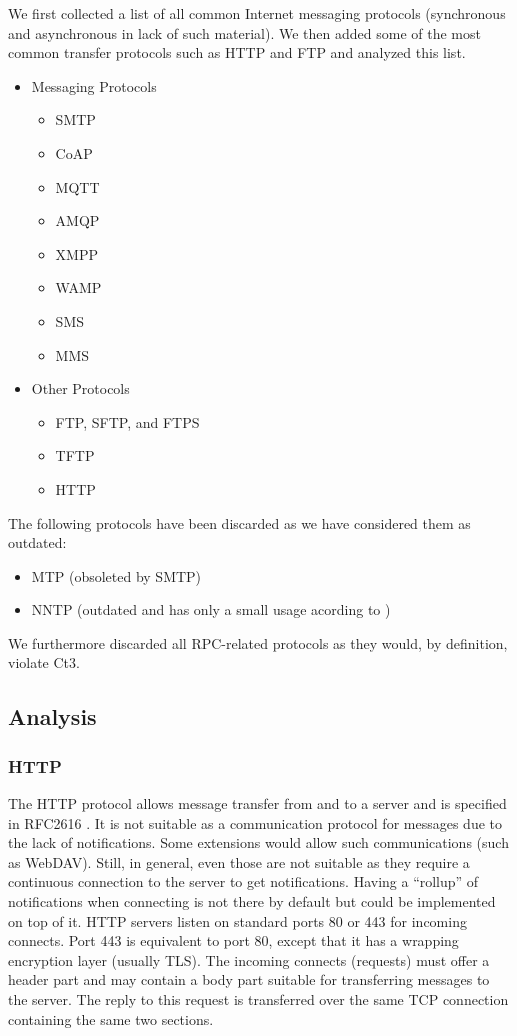 We first collected a list of all common Internet messaging protocols (synchronous and asynchronous in lack of such material). We then added some of the most common transfer protocols such as HTTP and FTP and analyzed this list.

\begin{itemize}
	\item Messaging Protocols
	\begin{itemize}
		\item SMTP
		\item CoAP
		\item MQTT
		\item AMQP
		\item XMPP
		\item WAMP
		\item SMS
		\item MMS
	\end{itemize}
	\item Other Protocols
	\begin{itemize}
		\item FTP, SFTP, and FTPS
		\item TFTP
		\item HTTP
	\end{itemize}
\end{itemize}

The following protocols have been discarded as we have considered them as outdated:
\begin{itemize}
	\item MTP\cite{rfc780} (obsoleted by SMTP)
	\item NNTP\cite{rfc3977} (outdated and has only a small usage acording to \cite{kim2010today})
\end{itemize}

We furthermore discarded all RPC-related protocols as they would, by definition, violate Ct3.

\subsection{Analysis}
\subsubsection*{HTTP}
The HTTP protocol allows message transfer from and to a server and is specified in RFC2616 \cite{rfc2616}. It is not suitable as a communication protocol for messages due to the lack of notifications. Some extensions would allow such communications (such as WebDAV). Still, in general, even those are not suitable as they require a continuous connection to the server to get notifications. Having a ``rollup'' of notifications when connecting is not there by default but could be implemented on top of it. HTTP servers listen on standard ports 80 or 443 for incoming connects. Port 443 is equivalent to port 80, except that it has a wrapping encryption layer (usually TLS). The incoming connects (requests) must offer a header part and may contain a body part suitable for transferring messages to the server. The reply to this request is transferred over the same TCP connection containing the same two sections.

